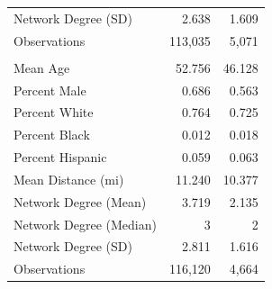 \begin{tabular}{lrr}
\hspace{1em}Network Degree (SD) & 2.638 & 1.609\\
\hspace{1em}Observations & 113,035 & 5,071\\
\addlinespace[0.3em]
\multicolumn{3}{l}{\textbf{Dermatology}}\\
\hspace{1em}Mean Age & 52.756 & 46.128\\
\hspace{1em}Percent Male & 0.686 & 0.563\\
\hspace{1em}Percent White & 0.764 & 0.725\\
\hspace{1em}Percent Black & 0.012 & 0.018\\
\hspace{1em}Percent Hispanic & 0.059 & 0.063\\
\hspace{1em}Mean Distance (mi) & 11.240 & 10.377\\
\hspace{1em}Network Degree (Mean) & 3.719 & 2.135\\
\hspace{1em}Network Degree (Median) & 3 & 2\\
\hspace{1em}Network Degree (SD) & 2.811 & 1.616\\
\hspace{1em}Observations & 116,120 & 4,664\\
\bottomrule
\end{tabular}
